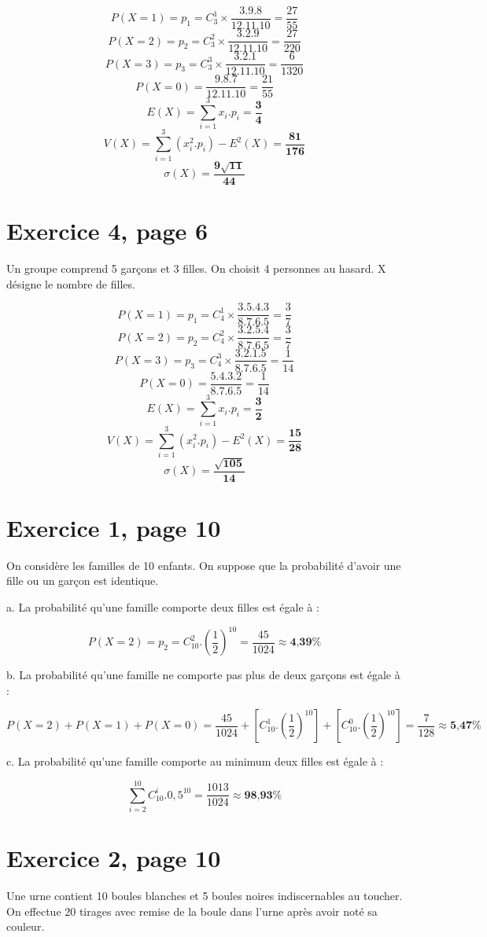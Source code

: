 \documentclass[10pt]{article}
\begin{document}
$$P(X=1)=p_1=C_3^1\times\frac{3.9.8}{12.11.10}=\frac{27}{55}$$
$$P(X=2)=p_2=C_3^2\times\frac{3.2.9}{12.11.10}=\frac{27}{220}$$
$$P(X=3)=p_3=C_3^3\times\frac{3.2.1}{12.11.10}=\frac{6}{1320}$$
$$P(X=0)=\frac{9.8.7}{12.11.10}=\frac{21}{55}$$
$$E(X)=\sum_{i=1}^3x_i.p_i=\frac{\textbf{3}}{\textbf{4}}$$
$$V(X)=\sum_{i=1}^3(x_i^2.p_i)-E^2(X)=\frac{\textbf{81}}{\textbf{176}}$$
$$\sigma(X)=\frac{\textbf{9}\sqrt{\textbf{11}}}{\textbf{44}}$$
\section*{Exercice 4, page 6}
Un groupe comprend 5 garçons et 3 filles. On choisit 4 personnes au hasard. X
désigne le nombre de filles.

$$P(X=1)=p_1=C_4^1\times\frac{3.5.4.3}{8.7.6.5}=\frac{3}{7}$$
$$P(X=2)=p_2=C_4^2\times\frac{3.2.5.4}{8.7.6.5}=\frac{3}{7}$$
$$P(X=3)=p_3=C_4^3\times\frac{3.2.1.5}{8.7.6.5}=\frac{1}{14}$$
$$P(X=0)=\frac{5.4.3.2}{8.7.6.5}=\frac{1}{14}$$
$$E(X)=\sum_{i=1}^3x_i.p_i=\frac{\textbf{3}}{\textbf{2}}$$
$$V(X)=\sum_{i=1}^3(x_i^2.p_i)-E^2(X)=\frac{\textbf{15}}{\textbf{28}}$$
$$\sigma(X)=\frac{\sqrt{\textbf{105}}}{\textbf{14}}$$

\newpage
\section*{Exercice 1, page 10}
On considère les familles de 10 enfants. On suppose que la probabilité d'avoir une
fille ou un garçon est identique.

a. La probabilité qu'une famille comporte deux filles est égale à :

$$P(X=2)=p_2=C_{10}^2.\left(\frac{1}{2}\right)^{10}=\frac{45}{1024}\approx\textbf{4,39\%}$$

b. La probabilité qu'une famille ne comporte pas plus de deux garçons est égale à :

$$P(X=2)+P(X=1)+P(X=0)=\frac{45}{1024}+\left[C_{10}^1.\left(\frac{1}{2}\right)^{10}\right]+\left[C_{10}^0.\left(\frac{1}{2}\right)^{10}\right]=\frac{7}{128}\approx\textbf{5,47\%}$$

c. La probabilité qu'une famille comporte au minimum deux filles est égale à :

$$\sum_{i=2}^{10}C_{10}^i.0,5^{10}=\frac{1013}{1024}\approx\textbf{98,93\%}$$
\section*{Exercice 2, page 10}
Une urne contient 10 boules blanches et 5 boules noires indiscernables au toucher.
On effectue 20 tirages avec remise de la boule dans l’urne après avoir noté sa
couleur.
\end{document}
